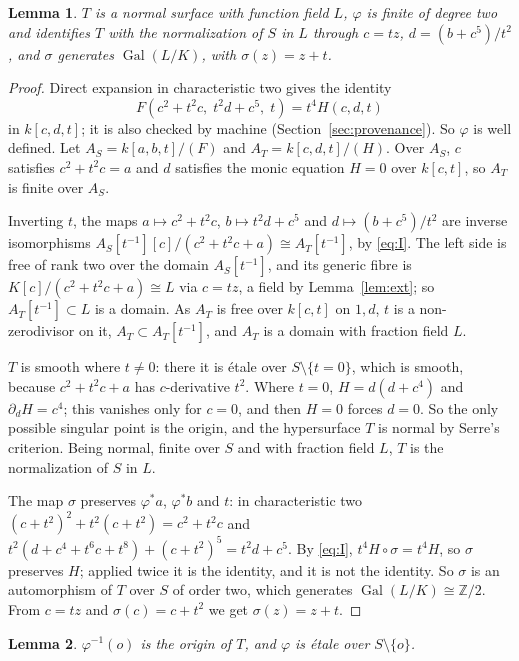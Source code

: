 \documentclass[11pt,a4paper]{article}
\newtheorem{lemma}{Lemma}[section]
\theoremstyle{definition}
\newcommand{\Z}{\mathbb{Z}}
\newcommand{\Gal}{\operatorname{Gal}}
\begin{document}
\begin{lemma}\label{lem:T}
$T$ is a normal surface with function field $L$, $\varphi$ is finite of
degree two and identifies $T$ with the normalization of $S$ in $L$ through
$c=tz$, $d=(b+c^5)/t^2$, and $\sigma$ generates $\Gal(L/K)$, with
$\sigma(z)=z+t$.
\end{lemma}

\begin{proof}
Direct expansion in characteristic two gives the identity
\begin{equation}\label{eq:I}
F(c^2+t^2c,\;t^2d+c^5,\;t)=t^4H(c,d,t)
\end{equation}
in $k[c,d,t]$; it is also checked by machine (Section~\ref{sec:provenance}).
So $\varphi$ is well defined. Let $A_S=k[a,b,t]/(F)$ and $A_T=k[c,d,t]/(H)$.
Over $A_S$, $c$ satisfies $c^2+t^2c=a$ and $d$ satisfies the monic equation
$H=0$ over $k[c,t]$, so $A_T$ is finite over $A_S$.

Inverting $t$, the maps $a\mapsto c^2+t^2c$, $b\mapsto t^2d+c^5$ and
$d\mapsto(b+c^5)/t^2$ are inverse isomorphisms
$A_S[t^{-1}][c]/(c^2+t^2c+a)\cong A_T[t^{-1}]$, by \eqref{eq:I}. The left side
is free of rank two over the domain $A_S[t^{-1}]$, and its generic fibre is
$K[c]/(c^2+t^2c+a)\cong L$ via $c=tz$, a field by Lemma~\ref{lem:ext}; so
$A_T[t^{-1}]\subset L$ is a domain. As $A_T$ is free over $k[c,t]$ on $1,d$,
$t$ is a non-zerodivisor on it, $A_T\subset A_T[t^{-1}]$, and $A_T$ is a
domain with fraction field $L$.

$T$ is smooth where $t\ne0$: there it is \'etale over $S\setminus\{t=0\}$,
which is smooth, because $c^2+t^2c+a$ has $c$-derivative $t^2$. Where $t=0$,
$H=d(d+c^4)$ and $\partial_dH=c^4$; this vanishes only for $c=0$, and then
$H=0$ forces $d=0$. So the only possible singular point is the origin, and
the hypersurface $T$ is normal by Serre's criterion. Being normal, finite
over $S$ and with fraction field $L$, $T$ is the normalization of $S$ in $L$.

The map $\sigma$ preserves $\varphi^*a$, $\varphi^*b$ and $t$: in
characteristic two $(c+t^2)^2+t^2(c+t^2)=c^2+t^2c$ and
$t^2(d+c^4+t^6c+t^8)+(c+t^2)^5=t^2d+c^5$. By \eqref{eq:I},
$t^4H\circ\sigma=t^4H$, so $\sigma$ preserves $H$; applied twice it is the
identity, and it is not the identity. So $\sigma$ is an automorphism of $T$
over $S$ of order two, which generates $\Gal(L/K)\cong\Z/2$. From $c=tz$ and
$\sigma(c)=c+t^2$ we get $\sigma(z)=z+t$.
\end{proof}

\begin{lemma}\label{lem:etale}
$\varphi^{-1}(o)$ is the origin of $T$, and $\varphi$ is \'etale over
$S\setminus\{o\}$.
\end{lemma}
\end{document}
